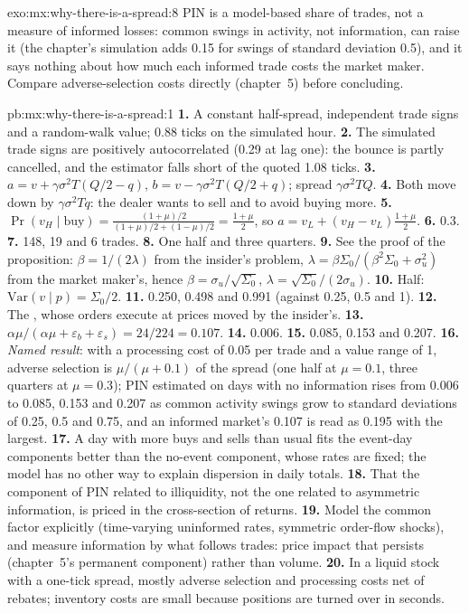 \begin{solution}{exo:mx:why-there-is-a-spread:8}
PIN is a model-based share of trades, not a measure of informed losses: common swings in activity, not information, can raise it (the chapter's simulation
adds 0.15 for swings of standard deviation 0.5), and it says nothing about how much each informed trade costs the market maker. Compare adverse-selection
costs directly (chapter~5) before concluding.
\end{solution}

\begin{solution}{pb:mx:why-there-is-a-spread:1}
\textbf{1.} A constant half-spread, independent trade signs and a random-walk value; 0.88 ticks on the simulated hour.
\textbf{2.} The simulated trade signs are positively autocorrelated (0.29 at lag one): the bounce is partly cancelled, and the estimator falls short of
the quoted 1.08 ticks.
\textbf{3.} $a=v+\gamma\sigma^2T(Q/2-q)$, $b=v-\gamma\sigma^2T(Q/2+q)$; spread $\gamma\sigma^2TQ$.
\textbf{4.} Both move down by $\gamma\sigma^2Tq$: the dealer wants to sell and to avoid buying more.
\textbf{5.} $\Pr(v_H\mid\text{buy})=\tfrac{(1+\mu)/2}{(1+\mu)/2+(1-\mu)/2}=\tfrac{1+\mu}{2}$, so $a=v_L+(v_H-v_L)\tfrac{1+\mu}{2}$.
\textbf{6.} 0.3.
\textbf{7.} 148, 19 and 6 trades.
\textbf{8.} One half and three quarters.
\textbf{9.} See the proof of the proposition: $\beta=1/(2\lambda)$ from the insider's problem, $\lambda=\beta\Sigma_0/(\beta^2\Sigma_0+\sigma_u^2)$ from the
market maker's, hence $\beta=\sigma_u/\sqrt{\Sigma_0}$, $\lambda=\sqrt{\Sigma_0}/(2\sigma_u)$.
\textbf{10.} Half: $\mathrm{Var}(v\mid p)=\Sigma_0/2$.
\textbf{11.} 0.250, 0.498 and 0.991 (against 0.25, 0.5 and 1).
\textbf{12.} The , whose orders execute at prices moved by the insider's.
\textbf{13.} $\alpha\mu/(\alpha\mu+\varepsilon_b+\varepsilon_s)=24/224=0.107$.
\textbf{14.} 0.006.
\textbf{15.} 0.085, 0.153 and 0.207.
\textbf{16.} \emph{Named result}: with a processing cost of 0.05 per trade and a value range of 1, adverse selection is $\mu/(\mu+0.1)$ of the spread
(one half at $\mu=0.1$, three quarters at $\mu=0.3$); PIN estimated on days with no information rises from 0.006 to 0.085, 0.153 and 0.207 as common activity
swings grow to standard deviations of 0.25, 0.5 and 0.75, and an informed market's 0.107 is read as 0.195 with the largest.
\textbf{17.} A day with more buys and sells than usual fits the event-day components better than the no-event component, whose rates are fixed; the model has
no other way to explain dispersion in daily totals.
\textbf{18.} That the component of PIN related to illiquidity, not the one related to asymmetric information, is priced in the cross-section of returns.
\textbf{19.} Model the common factor explicitly (time-varying uninformed rates, symmetric order-flow shocks), and measure information by what follows
trades: price impact that persists (chapter~5's permanent component) rather than volume.
\textbf{20.} In a liquid stock with a one-tick spread, mostly adverse selection and processing costs net of rebates; inventory costs are small because
positions are turned over in seconds.
\end{solution}


